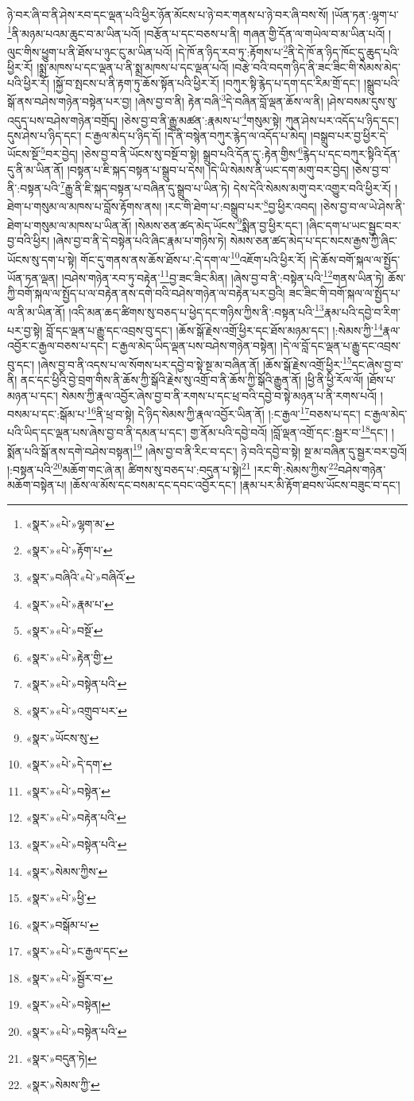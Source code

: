 ཉེ་བར་ཞི་བ་ནི་ཤེས་རབ་དང་ལྡན་པའི་ཕྱིར་ཉོན་མོངས་པ་ཉེ་བར་གནས་པ་ཉེ་བར་ཞི་བས་སོ། །ཡོན་ཏན་:ལྷག་པ་\footnote{«སྣར་»«པེ་»ལྷག་མ་}ནི་མཉམ་པའམ་ཆུང་བ་མ་ཡིན་པའོ། །བརྩོན་པ་དང་བཅས་པ་ནི། གཞན་གྱི་དོན་ལ་གཡེལ་བ་མ་ཡིན་པའོ། །ལུང་གིས་ཕྱུག་པ་ནི་ཐོས་པ་ཉུང་ངུ་མ་ཡིན་པའོ། །དེ་ཁོ་ན་ཉིད་རབ་ཏུ་:རྟོགས་པ་\footnote{«སྣར་»«པེ་»རྟོག་པ་}ནི་དེ་ཁོ་ན་ཉིད་ཁོང་དུ་ཆུད་པའི་ཕྱིར་རོ། །སྨྲ་མཁས་པ་དང་ལྡན་པ་ནི་སྨྲ་མཁས་པ་དང་ལྡན་པའོ། །བརྩེ་བའི་བདག་ཉིད་ནི་ཟང་ཟིང་གི་སེམས་མེད་པའི་ཕྱིར་རོ། །སྐྱོ་བ་སྤངས་པ་ནི་རྟག་ཏུ་ཆོས་སྟོན་པའི་ཕྱིར་རོ། །བཀུར་སྟི་རྙེད་པ་དག་དང་རིམ་གྲོ་དང་། །སྒྲུབ་པའི་སྒོ་ནས་བཤེས་གཉེན་བསྟེན་པར་བྱ། །ཞེས་བྱ་བ་ནི། རྟེན་བཞི་\footnote{«སྣར་»བཞིའི་«པེ་»བཞིའོ་}དེ་བཞིན་བློ་ལྡན་ཆོས་ལ་ནི། །ཤེས་བསམ་དུས་སུ་འདུད་པས་བཤེས་གཉེན་བགྲོད། །ཅེས་བྱ་བ་ནི་རྒྱུ་མཚན་:རྣམས་པ་\footnote{«སྣར་»«པེ་»རྣམ་པ་}གསུམ་སྟེ། ཀུན་ཤེས་པར་འདོད་པ་ཉིད་དང་། དུས་ཤེས་པ་ཉིད་དང་། ང་རྒྱལ་མེད་པ་ཉིད་དོ། །དེ་ནི་བསྙེན་བཀུར་རྙེད་ལ་འདོད་པ་མེད། །བསྒྲུབ་པར་བྱ་ཕྱིར་དེ་ཡོངས་སྔོ་\footnote{«སྣར་»«པེ་»བསྔོ་}བར་བྱེད། །ཅེས་བྱ་བ་ནི་ཡོངས་སུ་བསྔོ་བ་སྟེ། སྒྲུབ་པའི་དོན་དུ་:རྟེན་གྱིས་\footnote{«སྣར་»«པེ་»རྟེན་གྱི་}རྙེད་པ་དང་བཀུར་སྟིའི་དོན་དུ་ནི་མ་ཡིན་ནོ། །བསྟན་པ་ཇི་སྐད་བསྟན་པ་སྒྲུབ་པ་དེས། །དེ་ཡི་སེམས་ནི་ཡང་དག་མགུ་བར་བྱེད། །ཅེས་བྱ་བ་ནི་:བསྟན་པའི་\footnote{«སྣར་»«པེ་»བསྟེན་པའི་}རྒྱུ་ནི་ཇི་སྐད་བསྟན་པ་བཞིན་དུ་སྒྲུབ་པ་ཡིན་ཏེ། དེས་དེའི་སེམས་མགུ་བར་འགྱུར་བའི་ཕྱིར་རོ། །ཐེག་པ་གསུམ་ལ་མཁས་པ་བློས་རྟོགས་ནས། །རང་གི་ཐེག་པ་:བསྒྲུབ་པར་\footnote{«སྣར་»«པེ་»འགྲུབ་པར་}བྱ་ཕྱིར་འབད། །ཅེས་བྱ་བ་ལ་ཡེ་ཤེས་ནི་ཐེག་པ་གསུམ་ལ་མཁས་པ་ཡིན་ནོ། །སེམས་ཅན་ཚད་མེད་ཡོངས་\footnote{«སྣར་»ཡོངས་སུ་}སྨིན་བྱ་ཕྱིར་དང་། །ཞིང་དག་པ་ཡང་སྦྱང་བར་བྱ་བའི་ཕྱིར། །ཞེས་བྱ་བ་ནི་དེ་བསྟེན་པའི་ཞིང་རྣམ་པ་གཉིས་ཏེ། སེམས་ཅན་ཚད་མེད་པ་དང་སངས་རྒྱས་ཀྱི་ཞིང་ཡོངས་སུ་དག་པ་སྟེ། གོང་དུ་གནས་ནས་ཆོས་ཐོས་པ་:དེ་དག་ལ་\footnote{«སྣར་»«པེ་»དེ་དག་}འཇོག་པའི་ཕྱིར་རོ། །དེ་ཆོས་བགོ་སྐལ་ལ་སྤྱོད་ཡོན་ཏན་ལྡན། །བཤེས་གཉེན་རབ་ཏུ་བརྟེན་\footnote{«སྣར་»«པེ་»བསྟེན་}བྱ་ཟང་ཟིང་མིན། །ཞེས་བྱ་བ་ནི་:བསྟེན་པའི་\footnote{«སྣར་»«པེ་»བརྟེན་པའི་}གནས་ཡིན་ཏེ། ཆོས་ཀྱི་བགོ་སྐལ་ལ་སྤྱོད་པ་ལ་བརྟེན་ནས་དགེ་བའི་བཤེས་གཉེན་ལ་བརྟེན་པར་བྱའི། ཟང་ཟིང་གི་བགོ་སྐལ་ལ་སྤྱོད་པ་ལ་ནི་མ་ཡིན་ནོ། །འདི་མན་ཆད་ཚིགས་སུ་བཅད་པ་ཕྱེད་དང་གཉིས་ཀྱིས་ནི་:བསྟན་པའི་\footnote{«སྣར་»«པེ་»བསྟེན་པའི་}རྣམ་པའི་དབྱེ་བ་རིག་པར་བྱ་སྟེ། བློ་དང་ལྡན་པ་རྒྱུ་དང་འབྲས་བུ་དང་། །ཆོས་སྒོ་རྗེས་འགྲོ་ཕྱིར་དང་ཐོས་མཉམ་དང་། །:སེམས་ཀྱི་\footnote{«སྣར་»སེམས་ཀྱིས་}རྣལ་འབྱོར་ང་རྒྱལ་བཅས་པ་དང་། ང་རྒྱལ་མེད་ཡིད་ལྡན་པས་བཤེས་གཉེན་བསྟེན། །དེ་ལ་བློ་དང་ལྡན་པ་རྒྱུ་དང་འབྲས་བུ་དང་། །ཞེས་བྱ་བ་ནི་འདས་པ་ལ་སོགས་པར་དབྱེ་བ་སྟེ་སྔ་མ་བཞིན་ནོ། །ཆོས་སྒོ་རྗེས་འགྲོ་ཕྱིར་\footnote{«སྣར་»«པེ་»ཕྱི་}དང་ཞེས་བྱ་བ་ནི། ནང་དང་ཕྱིའི་བྱེ་བྲག་གིས་ནི་ཆོས་ཀྱི་སྒོའི་རྗེས་སུ་འགྲོ་བ་ནི་ཆོས་ཀྱི་སྒོའི་རྒྱུན་ནོ། །ཕྱི་ནི་ཕྱི་རོལ་ལོ། །ཐོས་པ་མཉན་པ་དང་། སེམས་ཀྱི་རྣལ་འབྱོར་ཞེས་བྱ་བ་ནི་རགས་པ་དང་ཕྲ་བའི་དབྱེ་བ་སྟེ་མཉན་པ་ནི་རགས་པའོ། །བསམ་པ་དང་:སྒོམ་པ་\footnote{«སྣར་»བསྒོམ་པ་}ནི་ཕྲ་བ་སྟེ། དེ་ཉིད་སེམས་ཀྱི་རྣལ་འབྱོར་ཡིན་ནོ། །:ང་རྒྱལ་\footnote{«སྣར་»«པེ་»ང་རྒྱལ་དང་}བཅས་པ་དང་། ང་རྒྱལ་མེད་པའི་ཡིད་དང་ལྡན་པས་ཞེས་བྱ་བ་ནི་དམན་པ་དང་། གྱ་ནོམ་པའི་དབྱེ་བའོ། །བློ་ལྡན་འགྲོ་དང་:སྦྱར་བ་\footnote{«སྣར་»«པེ་»སྦྱོར་བ་}དང་། །སྨོན་པའི་སྒོ་ནས་དགེ་བཤེས་བསྟན།\footnote{«སྣར་»«པེ་»བསྟེན།} །ཞེས་བྱ་བ་ནི་རིང་བ་དང་། ཉེ་བའི་དབྱེ་བ་སྟེ། སྔ་མ་བཞིན་དུ་སྦྱར་བར་བྱའོ། །:བསྟན་པའི་\footnote{«སྣར་»«པེ་»བསྟེན་པའི་}མཆོག་གང་ཞེ་ན། ཚིགས་སུ་བཅད་པ་:བདུན་པ་སྟེ།\footnote{«སྣར་»བདུན་ཏེ།} །རང་གི་:སེམས་ཀྱིས་\footnote{«སྣར་»སེམས་ཀྱི་}བཤེས་གཉེན་མཆོག་བསྟེན་པ། །ཆོས་ལ་མོས་དང་བསམ་དང་དབང་འབྱོར་དང་། །རྣམ་པར་མི་རྟོག་ཐབས་ཡོངས་བཟུང་བ་དང་། 